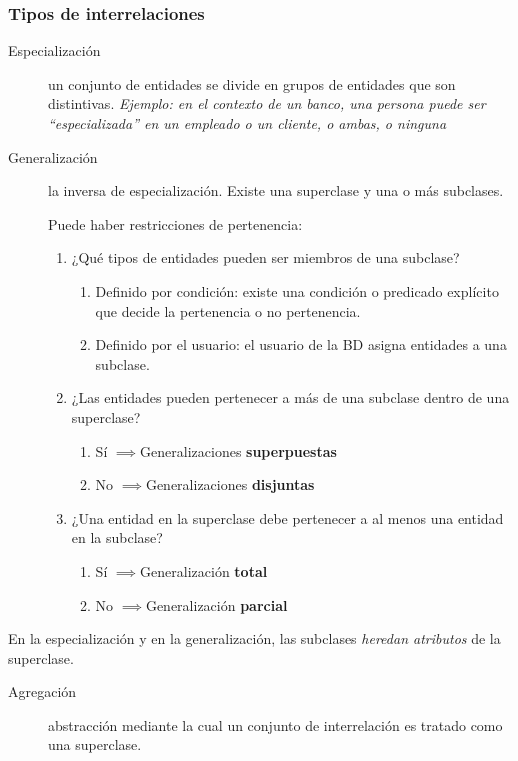 \documentclass[a4paper, twoside]{article}
\begin{document}
\subsubsection{Tipos de interrelaciones}
\begin{description}
\item [{Especialización}] un conjunto de entidades se divide en grupos
de entidades que son distintivas. \emph{Ejemplo: en el contexto de
un banco, una persona puede ser ``especializada'' en un empleado
o un cliente, o ambas, o ninguna}
\item [{Generalización}] la inversa de especialización. Existe una superclase
y una o más subclases. 


Puede haber restricciones de pertenencia:
\begin{enumerate}
\item ¿Qué tipos de entidades pueden ser miembros de una subclase?

\begin{enumerate}
\item Definido por condición: existe una condición o predicado explícito
que decide la pertenencia o no pertenencia.
\item Definido por el usuario: el usuario de la BD asigna entidades a una
subclase.
\end{enumerate}
\item ¿Las entidades pueden pertenecer a más de una subclase dentro de una
superclase?

\begin{enumerate}
\item Sí $\implies$Generalizaciones \textbf{superpuestas}
\item No $\implies$Generalizaciones \textbf{disjuntas}
\end{enumerate}
\item ¿Una entidad en la superclase debe pertenecer a al menos una entidad
en la subclase?

\begin{enumerate}
\item Sí $\implies$Generalización \textbf{total}
\item No $\implies$Generalización \textbf{parcial}
\end{enumerate}
\end{enumerate}
\end{description}
En la especialización y en la generalización, las subclases \emph{heredan
atributos} de la superclase.
\begin{description}
\item [{Agregación}] abstracción mediante la cual un conjunto de interrelación
es tratado como una superclase.
\end{description}
\end{document}
